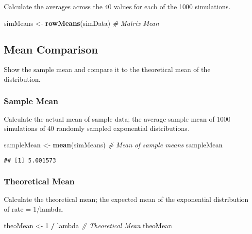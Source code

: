 \documentclass[]{article}
\newenvironment{Shaded}{\begin{snugshade}}{\end{snugshade}}
\newcommand{\KeywordTok}[1]{\textcolor[rgb]{0.13,0.29,0.53}{\textbf{#1}}}
\newcommand{\DecValTok}[1]{\textcolor[rgb]{0.00,0.00,0.81}{#1}}
\newcommand{\StringTok}[1]{\textcolor[rgb]{0.31,0.60,0.02}{#1}}
\newcommand{\CommentTok}[1]{\textcolor[rgb]{0.56,0.35,0.01}{\textit{#1}}}
\newcommand{\OperatorTok}[1]{\textcolor[rgb]{0.81,0.36,0.00}{\textbf{#1}}}
\newcommand{\NormalTok}[1]{#1}
\begin{document}
Calculate the averages across the 40 values for each of the 1000
simulations.

\begin{Shaded}
\begin{Highlighting}[]
\NormalTok{simMeans <-}\StringTok{ }\KeywordTok{rowMeans}\NormalTok{(simData) }\CommentTok{# Matrix Mean}
\end{Highlighting}
\end{Shaded}

\subsection{Mean Comparison}\label{mean-comparison}

Show the sample mean and compare it to the theoretical mean of the
distribution.

\subsubsection{Sample Mean}\label{sample-mean}

Calculate the actual mean of sample data; the average sample mean of
1000 simulations of 40 randomly sampled exponential distributions.

\begin{Shaded}
\begin{Highlighting}[]
\NormalTok{sampleMean <-}\StringTok{ }\KeywordTok{mean}\NormalTok{(simMeans) }\CommentTok{# Mean of sample means}
\NormalTok{sampleMean}
\end{Highlighting}
\end{Shaded}

\begin{verbatim}
## [1] 5.001573
\end{verbatim}

\subsubsection{Theoretical Mean}\label{theoretical-mean}

Calculate the theoretical mean; the expected mean of the exponential
distribution of rate = 1/lambda.

\begin{Shaded}
\begin{Highlighting}[]
\NormalTok{theoMean <-}\StringTok{ }\DecValTok{1} \OperatorTok{/}\StringTok{ }\NormalTok{lambda }\CommentTok{# Theoretical Mean}
\NormalTok{theoMean}
\end{Highlighting}
\end{Shaded}
\end{document}
